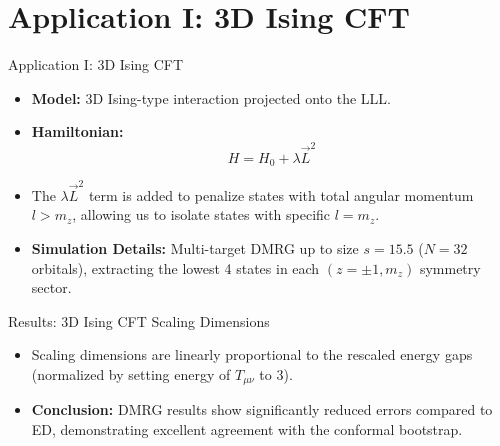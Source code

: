 \documentclass[aspectratio=169]{beamer}
\begin{document}
\section{Application I: 3D Ising CFT}
\begin{frame}{Application I: 3D Ising CFT}
    \begin{itemize}
        \item \textbf{Model:} 3D Ising-type interaction projected onto the LLL.
        \item \textbf{Hamiltonian:}
        \begin{equation*}
            H = H_0 + \lambda \vec{L}^2
        \end{equation*}
        \item The $\lambda \vec{L}^2$ term is added to penalize states with total angular momentum $l > m_z$, allowing us to isolate states with specific $l = m_z$.
        \item \textbf{Simulation Details:} Multi-target DMRG up to size $s=15.5$ ($N=32$ orbitals), extracting the lowest 4 states in each $(z=\pm 1, m_z)$ symmetry sector.
    \end{itemize}
\end{frame}

\begin{frame}{Results: 3D Ising CFT Scaling Dimensions}
    \begin{table}[]
        \centering
    \end{table}
    \vspace{0.3cm}
    \begin{itemize}
        \item Scaling dimensions are linearly proportional to the rescaled energy gaps (normalized by setting energy of $T_{\mu\nu}$ to 3).
        \item \textbf{Conclusion:} DMRG results show significantly reduced errors compared to ED, demonstrating excellent agreement with the conformal bootstrap.
    \end{itemize}
\end{frame}
\end{document}
